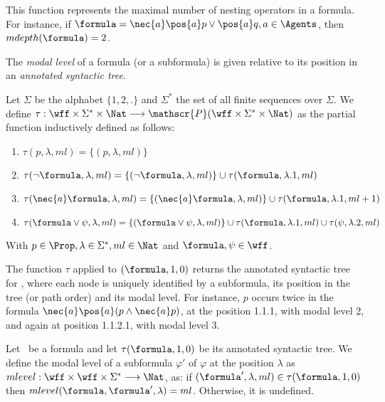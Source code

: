 This function represents the maximal number of nesting operators in a formula.
For instance, if $\formula = \nec{a}\pos{a} p \lor \pos{a} q, a \in \Agents$,
then $mdepth(\formula) = 2$.

The \emph{modal level} of a formula (or a subformula) is given relative to its position in an
\emph{annotated syntactic tree}.

\begin{definition}%
    Let $\Sigma$ be the alphabet $\{1, 2,.\}$ and $\Sigma^*$ the set of all
    finite sequences over $\Sigma$. 
    We define $\tau : \wff \times \Sigma^* \times \Nat
    \longrightarrow \mathscr{P}(\wff \times \Sigma^* \times \Nat)$ as the
    partial function inductively defined as follows:
    \begin{enumerate}
        \item $\tau(p, \lambda, ml) = \{(p, \lambda, ml)\}$
        \item $\tau(\neg \formula, \lambda, ml) = \{(\neg \formula, \lambda, ml)\} \cup \tau(\formula, \lambda.1, ml)$
        \item $\tau(\nec{a} \formula, \lambda, ml) = \{(\nec{a} \formula, \lambda, ml)\} \cup \tau(\formula, \lambda.1, ml + 1)$
        \item $\tau(\formula \lor \psi, \lambda, ml) = \{(\formula \lor \psi, \lambda, ml)\} \cup \tau(\formula, \lambda.1, ml) \cup \tau(\psi, \lambda.2, ml)$
    \end{enumerate}
    With $p \in \Prop, \lambda \in \Sigma^*, ml \in \Nat$ and $\formula, \psi
    \in \wff$.
\end{definition}

The function $\tau$ applied to $(\formula, 1, 0)$ returns the
annotated syntactic tree for \formula, where each node is uniquely identified by
a subformula, its position in the tree (or path order) and its modal level. For
instance, $p$ occurs twice in the formula $\nec{a}\pos{a}(p \land \nec{a} p)$,
at the position 1.1.1, with modal level 2, and again at position
1.1.2.1, with modal level 3.

\begin{definition}
    Let \formula~be a formula and let $\tau(\formula, 1, 0)$ be its
    annotated syntactic tree. We define the modal level of a subformula
    $\varphi'$ of $\varphi$ at the position $\lambda$ as $mlevel : \wff \times \wff \times \Sigma^*
    \longrightarrow \Nat$, as: if $(\formula', \lambda, ml)\in \tau(\formula,
    1, 0)$ then $mlevel(\formula, \formula', \lambda) = ml$. Otherwise, it is
    undefined.
\end{definition}

